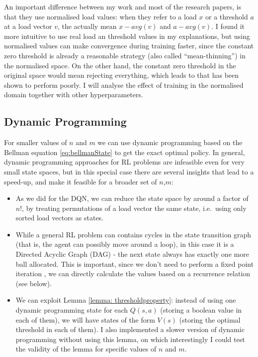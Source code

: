 An important difference between my work and most of the research papers, is that they use normalised load values: when they refer to a load $x$ or a threshold $a$ at a load vector $v$, the actually mean $x-avg(v)$ and $a-avg(v)$. I found it more intuitive to use real load an threshold values in my explanations, but using normalised values can make convergence during training faster, since the constant zero threshold is already a reasonable strategy (also called ``mean-thinning'') in the normalised space. On the other hand, the constant zero threshold in the original space would mean rejecting everything, which leads to \OneChoice that has been shown to perform poorly. I will analyse the effect of training in the normalised domain together with other hyperparameters.



\subsection{Dynamic Programming}


For smaller values of $n$ and $m$ we can use dynamic programming based on the Bellman equation \ref{eq:bellmanState} to get the exact optimal policy. In general, dynamic programming approaches for RL problems are infeasible even for very small state spaces, but in this special case there are several insights that lead to a speed-up, and make it feasible for a broader set of $n$,$m$:


\begin{itemize}
    \item 
    As we did for the DQN, we can reduce the state space by around a factor of $n!$, by treating permutations of a load vector the same state, i.e.\ using only sorted load vectors as states.
    \item
    While a general RL problem can contains cycles in the state transition graph (that is, the agent can possibly move around a loop), in this case it is a Directed Acyclic Graph (DAG) - the next state always has exactly one more ball allocated. This is important, since we don't need to perform a fixed point iteration \cite{rhoades1991fixedpointiteration}, we can directly calculate the values based on a recurrence relation (see below).
    \item
    We can exploit Lemma \ref{lemma: thresholdproperty}: instead of using one dynamic programming state for each $Q(s,a)$ (storing a boolean value in each of them), we will have states of the form $V(s)$ (storing the optimal threshold in each of them). I also implemented a slower version of dynamic programming without using this lemma, on which interestingly I could test the validity of the lemma for specific values of $n$ and $m$.
\end{itemize}


